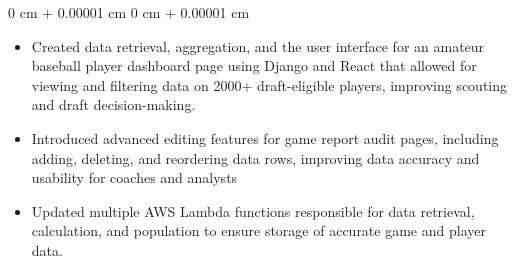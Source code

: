 \documentclass[10pt, letterpaper]{article}
\newenvironment{highlights}{
    \begin{itemize}[
        topsep=0.10 cm,
        parsep=0.10 cm,
        partopsep=0pt,
        itemsep=0pt,
        leftmargin=0 cm + 10pt
    ]
}{
    \end{itemize}
} %
\newenvironment{onecolentry}{
    \begin{adjustwidth}{
        0 cm + 0.00001 cm
    }{
        0 cm + 0.00001 cm
    }
}{
    \end{adjustwidth}
} %
\begin{document}
    \vspace{0.10 cm}
    \begin{onecolentry}
      \begin{highlights}
        \item Created data retrieval, aggregation, and the user interface for an amateur baseball player dashboard page using Django and React that allowed for viewing and filtering data on 2000+ draft-eligible players, improving scouting and draft decision-making.
        \item Introduced advanced editing features for game report audit pages, including adding, deleting, and reordering data rows, improving data accuracy and usability for coaches and analysts
        \item Updated multiple AWS Lambda functions responsible for data retrieval, calculation, and population to ensure storage of accurate game and player data.
      \end{highlights}
    \end{onecolentry}
    
\end{document}
